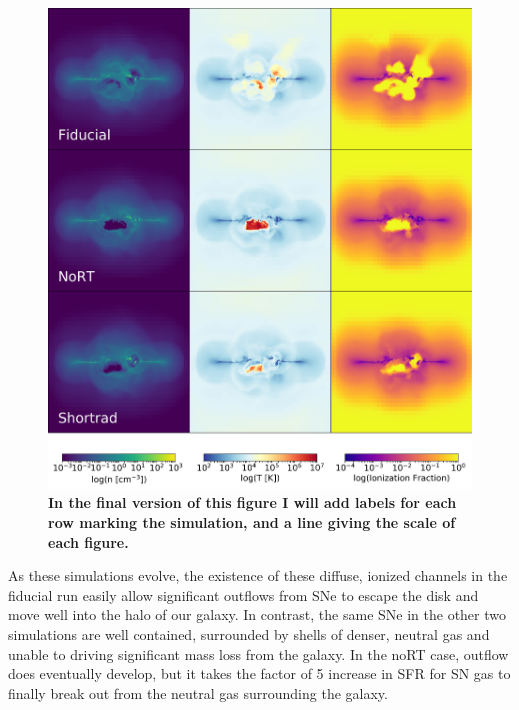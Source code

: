 \documentclass[twocolumn]{aastex62}
\begin{document}
\begin{figure}
\centering
\includegraphics[width=0.99\linewidth]{DD0136_fiducial_shortrad_nort}
\caption{\textbf{In the final version of this figure I will add labels for each row marking the simulation, and a line giving the scale of each figure.}}
\label{fig:pane1l}
\end{figure}

As these simulations evolve, the existence of these diffuse, ionized channels in the fiducial run easily allow significant outflows from SNe to escape the disk and move well into the halo of our galaxy. In contrast, the same SNe in the other two simulations are well contained, surrounded by shells of denser, neutral gas and unable to driving significant mass loss from the galaxy. In the noRT case, outflow does eventually develop, but it takes the factor of 5 increase in SFR for SN gas to finally break out from the neutral gas surrounding the galaxy.
\end{document}
